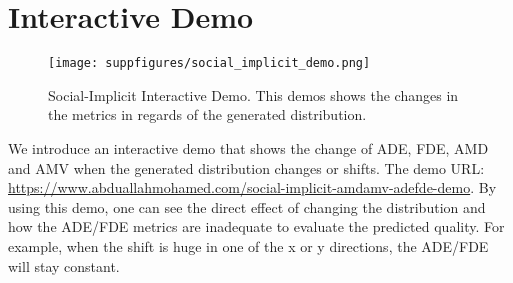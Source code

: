 \documentclass[runningheads]{llncs}
\begin{document}
\clearpage



\appendix

\section{Interactive Demo}

\begin{figure}[ht]
\begin{center}
\texttt{[image: suppfigures/social\_implicit\_demo.png]}
\caption{Social-Implicit Interactive Demo. This demos shows the changes in the metrics in regards of the generated distribution. }
\label{gr:social_implicit_demo}
\end{center}
\end{figure}
We introduce an interactive demo that shows the change of ADE, FDE, AMD and AMV when the generated distribution changes or shifts. The demo URL: \url{https://www.abduallahmohamed.com/social-implicit-amdamv-adefde-demo}. By using this demo, one can see the direct effect of changing the distribution and how the ADE/FDE metrics are inadequate to evaluate the predicted quality. For example, when the shift is huge in one of the x or y directions, the ADE/FDE will stay constant.
\end{document}
